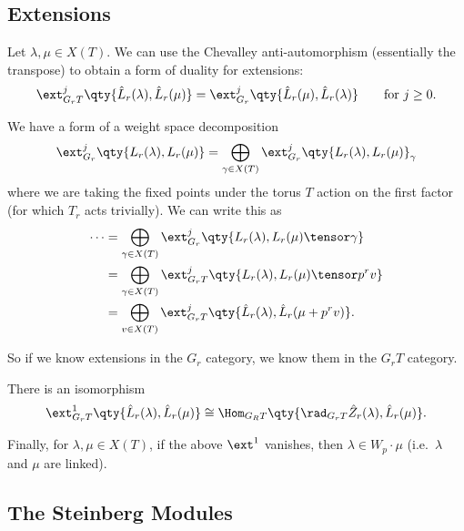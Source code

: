 \hypertarget{extensions}{%
\subsection{Extensions}\label{extensions}}

Let \(\lambda, \mu \in X(T)\). We can use the Chevalley
anti-automorphism (essentially the transpose) to obtain a form of
duality for extensions:
\begin{align*}  
\ext_{G_r T}^j \qty{ \hat{L}_r(\lambda), \hat{L}_r(\mu) } 
= 
\ext_{G_r}^j \qty{ \hat{L}_r(\mu), \hat{L}_r(\lambda) } \qquad \text{for }j\geq 0
.\end{align*}

We have a form of a weight space decomposition
\begin{align*}  
\ext_{G_r}^j \qty{L_r(\lambda), L_r(\mu) }
= \bigoplus_{\gamma \in X(T)} \ext_{G_r}^j \qty{L_r(\lambda), L_r(\mu) }_{\gamma}
\end{align*} where we are taking the fixed points under the torus \(T\)
action on the first factor (for which \(T_r\) acts trivially). We can
write this as
\begin{align*}  
\cdots 
&= \bigoplus_{\gamma \in X(T)} \ext_{G_r}^j \qty{L_r(\lambda), L_r(\mu) \tensor \gamma } \\
&= \bigoplus_{\gamma \in X(T)} \ext_{G_rT}^j \qty{L_r(\lambda), L_r(\mu) \tensor p^r v } \\
&= \bigoplus_{v \in X(T)} \ext_{G_rT}^j \qty{ \hat{L}_r(\lambda), \hat{L}_r(\mu + p^r v) }
.\end{align*}

So if we know extensions in the \(G_r\) category, we know them in the
\(G_r T\) category.

There is an isomorphism
\begin{align*}  
\ext_{G_r T}^1 \qty{ \hat{L}_r(\lambda), \hat{L}_r(\mu) } 
\cong \Hom_{G_R T}\qty{ \rad_{G_r T} \hat{Z}_r(\lambda), \hat{L}_r(\mu) }
.\end{align*}

Finally, for \(\lambda, \mu \in X(T)\), if the above \(\ext^1\)
vanishes, then \(\lambda \in W_p \cdot \mu\) (i.e.~\(\lambda\) and
\(\mu\) are linked).

\hypertarget{the-steinberg-modules}{%
\subsection{The Steinberg Modules}\label{the-steinberg-modules}}

